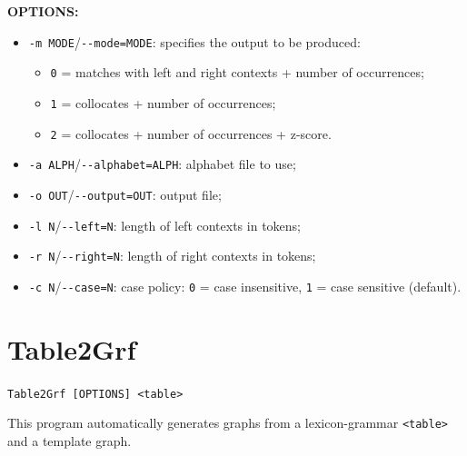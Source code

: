 \bigskip
\noindent \textbf{OPTIONS:}
\begin{itemize}
  \item \verb+-m MODE+/\verb+--mode=MODE+: specifies the output to be produced:
  \begin{itemize}
      \item \verb+0+ = matches with left and right contexts + number of
      occurrences;
      \item \verb+1+ = collocates + number of occurrences;
      \item \verb+2+ = collocates + number of occurrences + z-score.
  \end{itemize}

  \item \verb+-a ALPH+/\verb+--alphabet=ALPH+: alphabet file to use;

  \item \verb+-o OUT+/\verb+--output=OUT+: output file;

  \item \verb+-l N+/\verb+--left=N+: length of left contexts in tokens;
   
  \item \verb+-r N+/\verb+--right=N+: length of right contexts in tokens;
  
  \item \verb+-c N+/\verb+--case=N+: case policy: \verb+0+ = case insensitive,
  \verb+1+ = case sensitive (default).
\end{itemize}







\section{Table2Grf}
\verb+Table2Grf [OPTIONS] <table>+

\bigskip
\noindent {}This 
program automatically generates graphs from a lexicon-grammar \verb+<table>+
and a template graph.

